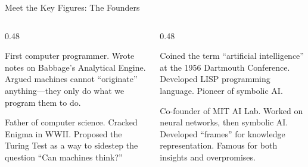 \documentclass[aspectratio=169,11pt]{beamer}
\begin{document}
\begin{frame}{Meet the Key Figures: The Founders}
\begin{columns}[T]
\begin{column}{0.48\textwidth}
\begin{figurebox}
\scriptsize
First computer programmer. Wrote notes on Babbage's Analytical Engine. Argued machines cannot ``originate'' anything---they only do what we program them to do.
\end{figurebox}

\vspace{0.2em}
\begin{figurebox}
\scriptsize
Father of computer science. Cracked Enigma in WWII. Proposed the Turing Test \parencite{turing_computing_machinery} as a way to sidestep the question ``Can machines think?''
\end{figurebox}
\end{column}
\begin{column}{0.48\textwidth}
\begin{figurebox}
\scriptsize
Coined the term ``artificial intelligence'' at the 1956 Dartmouth Conference. Developed LISP programming language. Pioneer of symbolic AI.
\end{figurebox}

\vspace{0.2em}
\begin{figurebox}
\scriptsize
Co-founder of MIT AI Lab. Worked on neural networks, then symbolic AI. Developed ``frames'' for knowledge representation. Famous for both insights and overpromises.
\end{figurebox}
\end{column}
\end{columns}
\end{frame}
\end{document}
